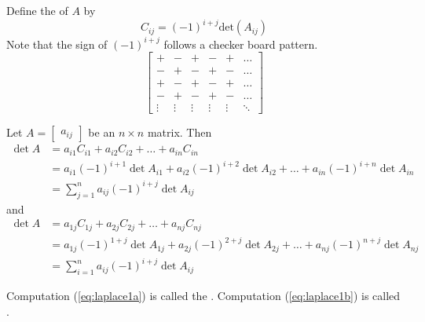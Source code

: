 \documentclass{ximera}
\begin{document}
 Define the  of $A$ by
 $$C_{ij}=(-1)^{i+j}\text{det}(A_{ij})$$
 Note that the sign of $(-1)^{i+j}$ follows a checker board pattern.
 $$\begin{bmatrix}+&-&+&-&+&\ldots\\-&+&-&+&-&\ldots\\
 +&-&+&-&+&\ldots\\-&+&-&+&-&\ldots\\\vdots &\vdots  & \vdots & \vdots &\vdots &\ddots \end{bmatrix}$$

\begin{theorem}\label{th:laplace1}
Let $A=\begin{bmatrix}a_{ij}\end{bmatrix}$ be an $n\times n$ matrix.  Then
\begin{align}\label{eq:laplace1a}
\det{A}&=a_{i1}C_{i1}+a_{i2}C_{i2}+\ldots +a_{in}C_{in}\nonumber\\
&=a_{i1}(-1)^{i+1}\det{A_{i1}}+a_{i2}(-1)^{i+2}\det{A_{i2}}+\ldots +a_{in}(-1)^{i+n}\det{A_{in}}\nonumber\\
&=\sum_{j=1}^na_{ij}(-1)^{i+j}\det{A_{ij}}
\end{align}
and
\begin{align}\label{eq:laplace1b}
\det{A}&=a_{1j}C_{1j}+a_{2j}C_{2j}+\ldots +a_{nj}C_{nj}\nonumber\\
&=a_{1j}(-1)^{1+j}\det{A_{1j}}+a_{2j}(-1)^{2+j}\det{A_{2j}}+\ldots +a_{nj}(-1)^{n+j}\det{A_{nj}}\nonumber\\
&=\sum_{i=1}^na_{ij}(-1)^{i+j}\det{A_{ij}}
\end{align}
\end{theorem}
 
 Computation (\ref{eq:laplace1a}) is called the .  Computation (\ref{eq:laplace1b}) is called .  
 
\end{document}

